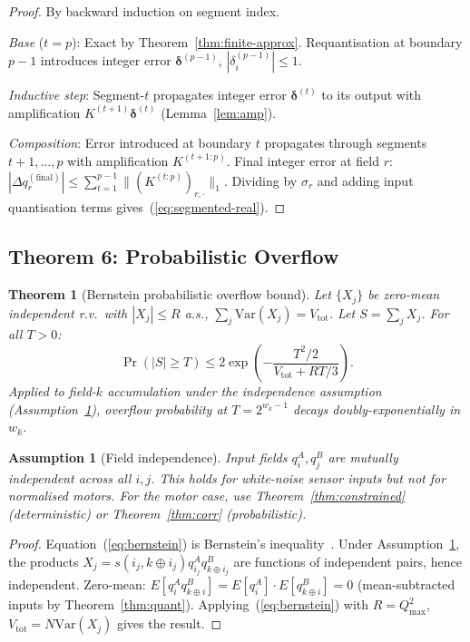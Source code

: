\documentclass[11pt,a4paper]{article}
\theoremstyle{definition}
\theoremstyle{plain}
\newtheorem{theorem}{Theorem}[section]
\newtheorem{assumption}{Assumption}[section]
\theoremstyle{remark}
\newcommand{\bv}[1]{\mathbf{#1}}
\newcommand{\Var}{\mathrm{Var}}
\begin{document}
\begin{proof}
By backward induction on segment index.

\emph{Base} ($t=p$): Exact by Theorem~\ref{thm:finite-approx}.
Requantisation at boundary $p-1$ introduces integer error $\bv{\delta}^{(p-1)}$,
$|\delta_i^{(p-1)}|\le1$.

\emph{Inductive step}: Segment-$t$ propagates integer error
$\bv{\delta}^{(t)}$ to its output with amplification $K^{(t+1)}\bv{\delta}^{(t)}$
(Lemma~\ref{lem:amp}).

\emph{Composition}: Error introduced at boundary $t$ propagates through
segments $t+1,\ldots,p$ with amplification $K^{(t+1:p)}$.
Final integer error at field $r$:
$|\Delta q_r^{(\mathrm{final})}|\le\sum_{t=1}^{p-1}\|(K^{(t:p)})_{r,\cdot}\|_1.$
Dividing by $\sigma_r$ and adding input quantisation terms
gives~(\ref{eq:segmented-real}).
\end{proof}

\subsection{Theorem 6: Probabilistic Overflow}
\label{sec:prob}

\begin{theorem}[Bernstein probabilistic overflow bound]
\label{thm:prob}
Let $\{X_j\}$ be zero-mean independent r.v.\ with $|X_j|\le R$ a.s.,
$\sum_j\Var(X_j)=V_{\mathrm{tot}}$.
Let $S=\sum_j X_j$.
For all $T>0$:
\begin{equation}\label{eq:bernstein}
  \Pr(|S|\ge T)\le2\exp\!\left(-\frac{T^2/2}{V_{\mathrm{tot}}+RT/3}\right).
\end{equation}
Applied to field-$k$ accumulation under the independence assumption
(Assumption~\ref{ass:independence}), overflow probability at
$T=2^{w_k-1}$ decays doubly-exponentially in $w_k$.
\end{theorem}

\begin{assumption}[Field independence]
\label{ass:independence}
Input fields $q_i^A,q_j^B$ are mutually independent across all $i,j$.
This holds for white-noise sensor inputs but not for normalised motors.
For the motor case, use Theorem~\ref{thm:constrained} (deterministic)
or Theorem~\ref{thm:corr} (probabilistic).
\end{assumption}

\begin{proof}
Equation~(\ref{eq:bernstein}) is Bernstein's inequality~\cite{boucheron2013}.
Under Assumption~\ref{ass:independence}, the products
$X_j=s(i_j,k\oplus i_j)q_{i_j}^Aq_{k\oplus i_j}^B$
are functions of independent pairs, hence independent.
Zero-mean: $E[q_i^Aq_{k\oplus i}^B]=E[q_i^A]\cdot E[q_{k\oplus i}^B]=0$
(mean-subtracted inputs by Theorem~\ref{thm:quant}).
Applying~(\ref{eq:bernstein}) with $R=Q_{\max}^2$,
$V_{\mathrm{tot}}=N\Var(X_j)$ gives the result.
\end{proof}
\end{document}
